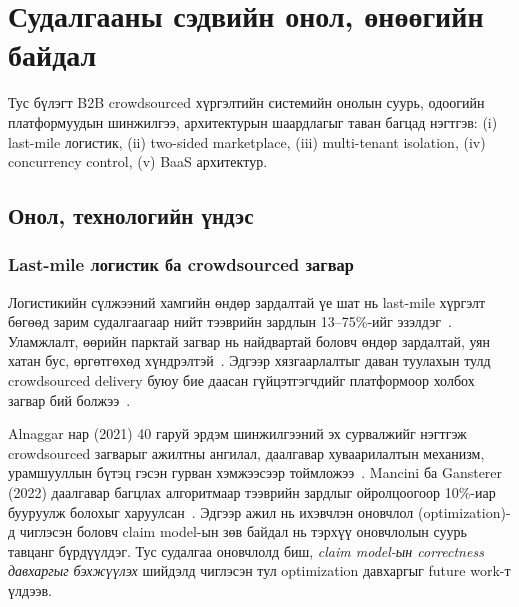 
\section{Судалгааны сэдвийн онол, өнөөгийн байдал}
\label{sec:background}

Тус бүлэгт B2B crowdsourced хүргэлтийн системийн онолын суурь, одоогийн платформуудын шинжилгээ, архитектурын шаардлагыг таван багцад нэгтгэв: (i) last-mile логистик, (ii) two-sided marketplace, (iii) multi-tenant isolation, (iv) concurrency control, (v) BaaS архитектур.

\subsection{Онол, технологийн үндэс}
\label{subsec:theory_foundation}

\subsubsection{Last-mile логистик ба crowdsourced загвар}
\label{subsubsec:lastmile}

Логистикийн сүлжээний хамгийн өндөр зардалтай үе шат нь last-mile хүргэлт бөгөөд зарим судалгаагаар нийт тээврийн зардлын 13--75\%-ийг эзэлдэг~\cite{savelsbergh2016city, lim2018lastmile}. Уламжлалт, өөрийн парктай загвар нь найдвартай боловч өндөр зардалтай, уян хатан бус, өргөтгөхөд хүндрэлтэй~\cite{chopra2019supply, mckinnon2015greenlogistics}. Эдгээр хязгаарлалтыг даван туулахын тулд crowdsourced delivery буюу бие даасан гүйцэтгэгчдийг платформоор холбох загвар бий болжээ~\cite{rouges2014crowdsourcing}.

Alnaggar нар (2021) 40 гаруй эрдэм шинжилгээний эх сурвалжийг нэгтгэж crowdsourced загварыг ажилтны ангилал, даалгавар хуваарилалтын механизм, урамшууллын бүтэц гэсэн гурван хэмжээсээр тоймложээ~\cite{alnaggar2021crowdsourced}. Mancini ба Gansterer (2022) даалгавар багцлах алгоритмаар тээврийн зардлыг ойролцоогоор 10\%-иар бууруулж болохыг харуулсан~\cite{mancini2022bundle}. Эдгээр ажил нь ихэвчлэн оновчлол (optimization)-д чиглэсэн боловч claim model-ын зөв байдал нь тэрхүү оновчлолын суурь тавцанг бүрдүүлдэг. Тус судалгаа оновчлолд биш, \emph{claim model-ын correctness давхаргыг бэхжүүлэх} шийдэлд чиглэсэн тул optimization давхаргыг future work-т үлдээв.

